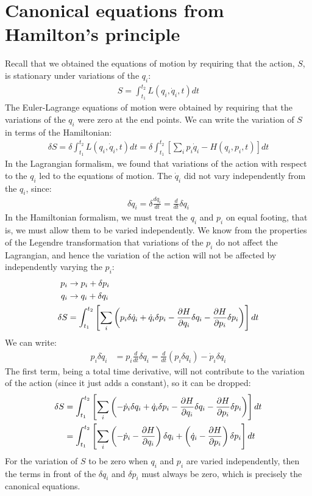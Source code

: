 \section{Canonical equations from Hamilton's principle}
Recall that we obtained the equations of motion by requiring that the action, $S$, is stationary under variations of the $q_i$:
\begin{align}
S=\int_{t_1}^{t_2}L(q_i,\dot q_i, t) dt
\end{align}
The Euler-Lagrange equations of motion were obtained by requiring that the variations of the $q_i$ were zero at the end points. We can write the variation of $S$ in terms of the Hamiltonian:
\begin{align}
\delta S = \delta \int_{t_1}^{t_2}L(q_i,\dot q_i, t) dt = \delta\int_{t_1}^{t_2}\left[\sum_ip_i\dot q_i-H(q_i,p_i,t)\right]dt
\end{align}
In the Lagrangian formalism, we found that variations of the action with respect to the $q_i$ led to the equations of motion. The $\dot q_i$ did not vary independently from the $q_i$, since:
\begin{align}
\delta \dot q_i=\delta \frac{dq_i}{dt}=\frac{d}{dt}\delta q_i
\end{align}
In the Hamiltonian formalism, we must treat the $q_i$ and $p_i$ on equal footing, that is, we must allow them to be varied independently. We know from the properties of the Legendre transformation that variations of the $p_i$ do not affect the Lagrangian, and hence the variation of the action will not be affected by independently varying the $p_i$:
\begin{align}
p_i &\to p_i+\delta p_i \nonumber\\
q_i &\to q_i+\delta q_i\nonumber\\
\delta S &= \int_{t_1}^{t_2}\left[\sum_i\left(p_i\delta\dot q_i+\dot q_i \delta p_i-\frac{\partial H}{\partial q_i}\delta q_i -\frac{\partial H}{\partial p_i}\delta p_i\right)\right]dt
\end{align}
We can write:
\begin{align}
p_i\delta\dot q_i &=p_i\frac{d}{dt}\delta q_i=\frac{d}{dt}(p_i\delta q_i)-\dot p_i \delta q_i
\end{align}
The first term, being a total time derivative, will not contribute to the variation of the action (since it just adds a constant), so it can be dropped:
\begin{align}
\delta S &= \int_{t_1}^{t_2}\left[\sum_i\left(-\dot p_i \delta q_i+\dot q_i \delta p_i-\frac{\partial H}{\partial q_i}\delta q_i -\frac{\partial H}{\partial p_i}\delta p_i\right)\right]dt\nonumber\\
&=\int_{t_1}^{t_2}\left[\sum_i\left( -\dot p_i -\frac{\partial H}{\partial q_i}\right)\delta q_i+\left(\dot q_i-\frac{\partial H}{\partial p_i}  \right)\delta p_i  \right]dt
\end{align}
For the variation of $S$ to be zero when $q_i$ and $p_i$ are varied independently, then the terms in front of the $\delta q_i$ and $\delta p_i$ must always be zero, which is precisely the canonical equations.

